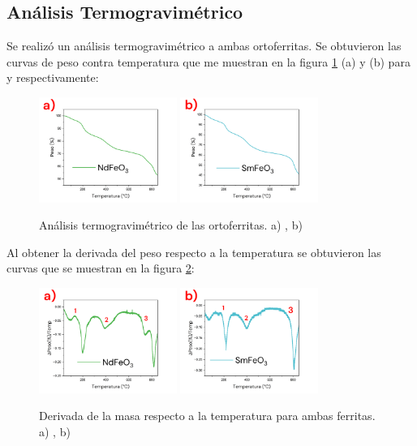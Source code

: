 \documentclass[../main.tex]{subfiles}
\begin{document}
\subsection{Análisis Termogravimétrico} \label{sec:TGA}
Se realizó un análisis termogravimétrico a ambas ortoferritas. Se obtuvieron las curvas de peso contra temperatura que me muestran en la figura \ref{fig:TGAres} (a) y (b) para \neod{} y \sama{} respectivamente:
\begin{figure}[H]
    \centering
    \includegraphics[width=0.4\textwidth]{fig/TGA-NdFeO3.png}
    \quad
    \includegraphics[width=0.4\textwidth]{fig/TGA-SmFeO3.png}
    \caption{Análisis termogravimétrico de las ortoferritas. a) \neod{}, b) \sama{}}
    \label{fig:TGAres}
\end{figure}
Al obtener la derivada del peso respecto a la temperatura se obtuvieron las curvas que se muestran en la figura \ref{fig:derTGAres}:
\begin{figure}[H]
    \centering
    \includegraphics[width=0.4\textwidth]{fig/TGA-derNdFeO3.png}
    \quad
    \includegraphics[width=0.4\textwidth]{fig/TGA-derSmFeO3.png}
    \caption{Derivada de la masa respecto a la temperatura para ambas ferritas. a) \neod{}, b) \sama{}}
    \label{fig:derTGAres}
\end{figure}
\end{document}
